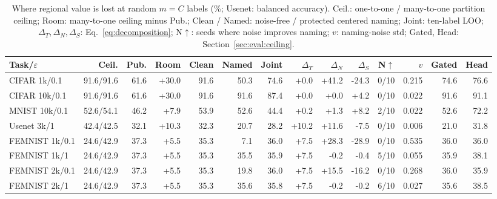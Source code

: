 \begin{table}[t]
\caption{Where regional value is lost at random $m=C$ labels (\%; Usenet: balanced accuracy). Ceil.: one-to-one / many-to-one partition ceiling; Room: many-to-one ceiling minus Pub.; Clean / Named: noise-free / protected centered naming; Joint: ten-label LOO; $\Delta_T,\Delta_N,\Delta_S$: Eq.~\eqref{eq:decomposition}; N$\uparrow$: seeds where noise improves naming; $v$: naming-noise std; Gated, Head: Section~\ref{sec:eval:ceiling}.}
\label{tab:decomposition}\small\setlength{\tabcolsep}{3.2pt}
\centering
\begin{tabular}{@{}lrrrrrrrrrrrrr@{}}\toprule
Task/$\varepsilon$ & Ceil. & Pub. & Room & Clean & Named & Joint & $\Delta_T$ & $\Delta_N$ & $\Delta_S$ & N$\uparrow$ & $v$ & Gated & Head \\
\midrule
CIFAR 1k/0.1 & 91.6/91.6 & 61.6 & +30.0 & 91.6 & 50.3 & 74.6 & +0.0 & +41.2 & -24.3 & 0/10 & 0.215 & 74.6 & 76.6 \\
CIFAR 10k/0.1 & 91.6/91.6 & 61.6 & +30.0 & 91.6 & 91.6 & 87.4 & +0.0 & +0.0 & +4.2 & 0/10 & 0.022 & 91.6 & 91.1 \\
MNIST 10k/0.1 & 52.6/54.1 & 46.2 & +7.9 & 53.9 & 52.6 & 44.4 & +0.2 & +1.3 & +8.2 & 2/10 & 0.022 & 52.6 & 72.2 \\
Usenet 3k/1 & 42.4/42.5 & 32.1 & +10.3 & 32.3 & 20.7 & 28.2 & +10.2 & +11.6 & -7.5 & 0/10 & 0.006 & 21.0 & 31.8 \\
FEMNIST 1k/0.1 & 24.6/42.9 & 37.3 & +5.5 & 35.3 & 7.1 & 36.0 & +7.5 & +28.3 & -28.9 & 0/10 & 0.535 & 36.0 & 36.0 \\
FEMNIST 1k/1 & 24.6/42.9 & 37.3 & +5.5 & 35.3 & 35.5 & 35.9 & +7.5 & -0.2 & -0.4 & 5/10 & 0.055 & 35.9 & 38.1 \\
FEMNIST 2k/0.1 & 24.6/42.9 & 37.3 & +5.5 & 35.3 & 19.8 & 36.0 & +7.5 & +15.5 & -16.2 & 0/10 & 0.268 & 36.0 & 35.9 \\
FEMNIST 2k/1 & 24.6/42.9 & 37.3 & +5.5 & 35.3 & 35.6 & 35.8 & +7.5 & -0.2 & -0.2 & 6/10 & 0.027 & 35.6 & 38.5 \\
\bottomrule\end{tabular}
\end{table}
